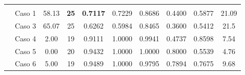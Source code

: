 \begin{table}[]
{\begin{tabular}{cccccccccc}
			\multicolumn{10}{c}{}                                                                                                                                                                                                                                                                                                                                                                                                                                                                   \\
			\multicolumn{1}{c|}{}                      & {\color[HTML]{003532} Caso 1} & {\color[HTML]{003532} 58.13}                                         & {\color[HTML]{9A0000} \textbf{25}}                                 & {\color[HTML]{9A0000} \textbf{0.7117}}                  & {\color[HTML]{003532} 0.7229} & {\color[HTML]{003532} 0.8686} & {\color[HTML]{003532} 0.4400} & {\color[HTML]{003532} 0.5877} & {\color[HTML]{003532} 21.09}                                         \\
			\multicolumn{1}{c|}{}                      & Caso 3                        & 65.07                                                                & 25                                                                 & 0.6262                                                  & 0.5984                        & 0.8465                        & 0.3600                        & 0.5412                        & 21.5                                                                 \\
			\multicolumn{1}{c|}{}                      & {\color[HTML]{003532} Caso 4} & {\color[HTML]{003532} 2.00}                                          & {\color[HTML]{003532} 19}                                          & {\color[HTML]{003532} 0.9111}                           & {\color[HTML]{003532} 1.0000} & {\color[HTML]{003532} 0.9941} & {\color[HTML]{003532} 0.4737} & {\color[HTML]{003532} 0.8598} & {\color[HTML]{003532} 7.54}                                          \\
			\multicolumn{1}{c|}{}                      & Caso 5                        & 0.00                                                                 & 20                                                                 & 0.9432                                                  & 1.0000                        & 1.0000                        & 0.8000                        & 0.5539                        & 4.76                                                                 \\
			\multicolumn{1}{c|}{}                      & {\color[HTML]{003532} Caso 6} & {\color[HTML]{003532} 5.00}                                          & {\color[HTML]{003532} 19}                                          & {\color[HTML]{003532} 0.9489}                           & {\color[HTML]{003532} 1.0000} & {\color[HTML]{003532} 0.9795} & {\color[HTML]{003532} 0.7894} & {\color[HTML]{003532} 0.7675} & {\color[HTML]{003532} 9.68}                                          \\

\end{tabular}}
\end{table}
